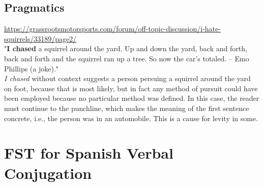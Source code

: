 \documentclass{amsart}
\theoremstyle{definition}
\theoremstyle{remark}
\numberwithin{equation}{section}
\begin{document}
\subsection{Pragmatics}

\url{https://grassrootsmotorsports.com/forum/off-topic-discussion/i-hate-squirrels/33189/page2/} \\

"\textbf{I chased} a squirrel around the yard. Up and down the yard, back and forth, back and forth and the squirrel ran up a tree. So now the car's totaled. -- Emo Phillips (a joke)." \\

\textit{I chased} without context suggests a person persuing a squirrel around the yard on foot, because that is most likely, but in fact any method of pursuit could have been employed because no particular method was defined. In this case, the reader must continue to the punchline, which makes the meaning of the first sentence concrete, i.e., the person was in an automobile. This is a cause for levity in some. \\


\section{FST for Spanish Verbal Conjugation}
    \begin{table}[ht]
    \centering
\end{table}
\end{document}
